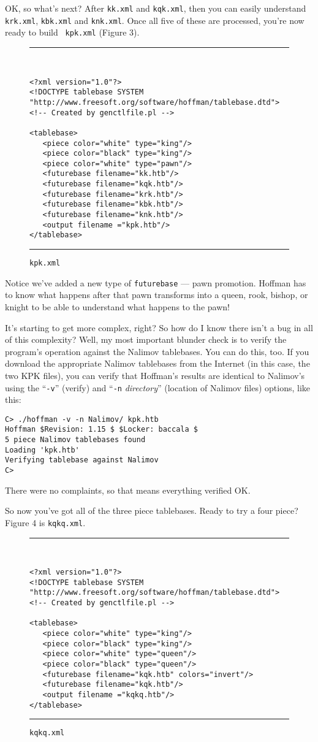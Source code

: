 \documentclass[11pt]{article}
\begin{document}
OK, so what's next?  After {\tt kk.xml} and {\tt kqk.xml}, then you
can easily understand {\tt krk.xml}, {\tt kbk.xml} and {\tt knk.xml}.
Once all five of these are processed, you're now ready to build {\tt
kpk.xml} (Figure 3).

\begin{figure}
\hrule\ 
{\small\begin{verbatim}
<?xml version="1.0"?>
<!DOCTYPE tablebase SYSTEM "http://www.freesoft.org/software/hoffman/tablebase.dtd">
<!-- Created by genctlfile.pl -->

<tablebase>
   <piece color="white" type="king"/>
   <piece color="black" type="king"/>
   <piece color="white" type="pawn"/>
   <futurebase filename="kk.htb"/>
   <futurebase filename="kqk.htb"/>
   <futurebase filename="krk.htb"/>
   <futurebase filename="kbk.htb"/>
   <futurebase filename="knk.htb"/>
   <output filename ="kpk.htb"/>
</tablebase>
\end{verbatim}}
\hrule
\caption{\tt kpk.xml}
\end{figure}

Notice we've added a new type of {\tt futurebase} --- pawn promotion.
Hoffman has to know what happens after that pawn transforms into a
queen, rook, bishop, or knight to be able to understand what happens
to the pawn!

It's starting to get more complex, right?  So how do I know there
isn't a bug in all of this complexity?  Well, my most important
blunder check is to verify the program's operation against the Nalimov
tablebases.  You can do this, too.  If you download the appropriate
Nalimov tablebases from the Internet (in this case, the two KPK
files), you can verify that Hoffman's results are identical to
Nalimov's using the ``{\tt -v}'' (verify) and ``{\tt -n} {\it
directory}'' (location of Nalimov files) options, like this:

\begin{verbatim}
C> ./hoffman -v -n Nalimov/ kpk.htb
Hoffman $Revision: 1.15 $ $Locker: baccala $
5 piece Nalimov tablebases found
Loading 'kpk.htb'
Verifying tablebase against Nalimov
C>
\end{verbatim}

There were no complaints, so that means everything verified OK.

So now you've got all of the three piece tablebases.  Ready to try a
four piece?  Figure 4 is {\tt kqkq.xml}.

\begin{figure}
\hrule\ 
{\small\begin{verbatim}
<?xml version="1.0"?>
<!DOCTYPE tablebase SYSTEM "http://www.freesoft.org/software/hoffman/tablebase.dtd">
<!-- Created by genctlfile.pl -->

<tablebase>
   <piece color="white" type="king"/>
   <piece color="black" type="king"/>
   <piece color="white" type="queen"/>
   <piece color="black" type="queen"/>
   <futurebase filename="kqk.htb" colors="invert"/>
   <futurebase filename="kqk.htb"/>
   <output filename ="kqkq.htb"/>
</tablebase>
\end{verbatim}}
\hrule
\caption{\tt kqkq.xml}
\end{figure}
\end{document}

